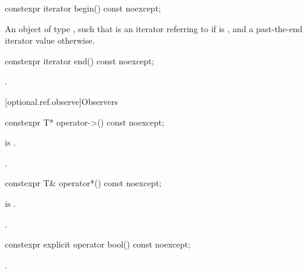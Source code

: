 %
\begin{itemdecl}
constexpr iterator begin() const noexcept;
\end{itemdecl}

\begin{itemdescr}
\pnum
\returns
An object  of type , such that  is an iterator referring to  if  is , and a past-the-end iterator value otherwise.
\end{itemdescr}

%
\begin{itemdecl}
constexpr iterator end() const noexcept;
\end{itemdecl}

\begin{itemdescr}
\pnum
\returns
{}.
\end{itemdescr}

[optional.ref.observe]{Observers}

%
\begin{itemdecl}
constexpr T* operator->() const noexcept;
\end{itemdecl}

\begin{itemdescr}
\pnum
\hardexpects
{} is .

\pnum
\returns
{}.
\end{itemdescr}

%
\begin{itemdecl}
constexpr T& operator*() const noexcept;
\end{itemdecl}

\begin{itemdescr}
\pnum
\hardexpects
{} is .

\pnum
\returns
{}.
\end{itemdescr}

%
\begin{itemdecl}
constexpr explicit operator bool() const noexcept;
\end{itemdecl}

\begin{itemdescr}
\pnum
\returns
{}.
\end{itemdescr}

